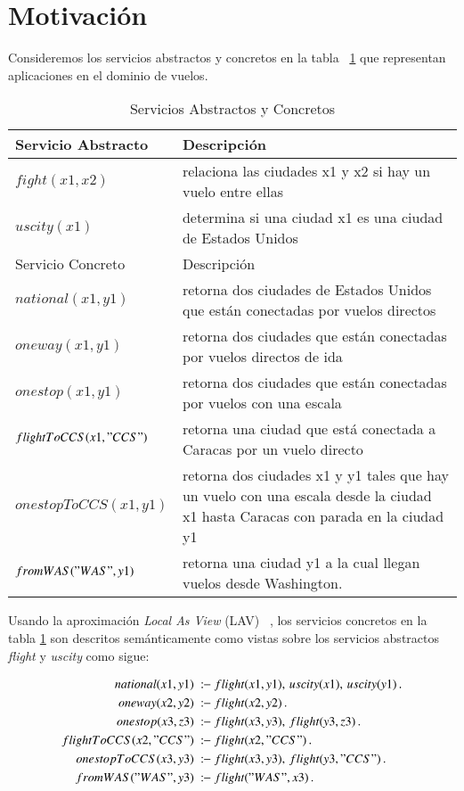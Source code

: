 \section{Motivación}

Consideremos los servicios abstractos y concretos en la tabla
~\ref{table:services} que representan aplicaciones en el dominio de vuelos.

\begin{table}
\begin{tabular}{| l| l |}
\hline
Servicio Abstracto & Descripción \\
\hline
$fight(x1,x2)$ & relaciona las ciudades x1 y x2 si hay un vuelo entre ellas\\
\hline
$uscity(x1)$ &  determina si una ciudad x1 es una ciudad de Estados Unidos\\
\hline \hline
Servicio Concreto & Descripción \\
\hline
$national(x1,y1)$&  retorna dos ciudades de Estados Unidos que están conectadas
por vuelos directos \\
\hline
$oneway(x1,y1)$ & retorna dos ciudades que están conectadas por vuelos directos
de ida\\
\hline
$onestop(x1,y1)$ & retorna dos ciudades que están conectadas por vuelos con una
escala\\
\hline
$ flightToCCS(x1,"CCS")$ & retorna una ciudad que está conectada a Caracas por
un vuelo directo\\
 \hline
$ onestopToCCS(x1,y1)$ & retorna dos ciudades x1 y y1 tales que hay un vuelo con
una escala desde la ciudad x1 hasta Caracas con parada en la ciudad y1\\
 \hline
 $fromWAS("WAS",y1)$ &  retorna una ciudad y1 a la cual llegan vuelos desde
Washington.\\
 \hline
\end{tabular}
\label{table:services}
\caption{Servicios Abstractos y Concretos}
\end{table}

Usando la aproximación \emph{Local As View} (LAV) ~\cite{AmbiteISWC09}, los
servicios concretos en la tabla \ref{table:services} son descritos
semánticamente como vistas sobre los servicios abstractos {\it flight} y
{\it uscity} como sigue:   

\begin{alignat*}{1}
national(x1,y1)\ &\qrule\ flight(x1,y1),\,  uscity(x1),\,  uscity(y1)\,. \\
oneway(x2,y2)\ &\qrule\ flight(x2,y2)\,. \\
onestop(x3,z3)\ &\qrule\ flight(x3,y3),\, flight(y3,z3)\,. \\
flightToCCS(x2,"CCS")\ &\qrule\ flight(x2,"CCS")\,. \\
onestopToCCS(x3,y3)\ &\qrule\ flight(x3,y3),\, flight(y3,"CCS")\,. \\
fromWAS("WAS",y3)\ &\qrule\ flight("WAS",x3)\,. \\
\end{alignat*}


